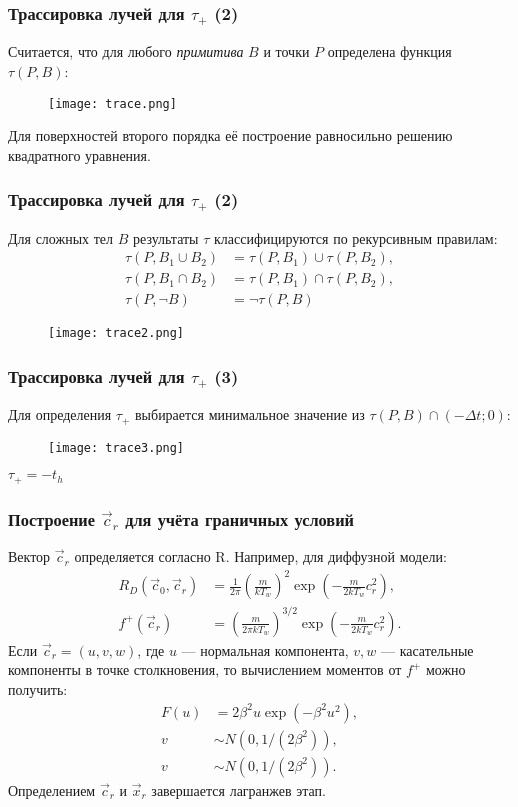 \documentclass[onlymath]{beamer}
\newcommand{\tr}\tau
\newcommand{\ts}{\Delta t}
\begin{document}
\begin{frame}
  \frametitle{Трассировка лучей для $\tau_+$ (2)}
  Считается, что для любого \emph{примитива} $B$ и точки $P$
  определена функция $\tau(P, B)$:
  \begin{figure}[!h]
    \centering
    \texttt{[image: trace.png]}
  \end{figure}
  Для поверхностей второго порядка её построение равносильно решению
  квадратного уравнения.
\end{frame}

\begin{frame}
  \frametitle{Трассировка лучей для $\tau_+$ (2)}
  Для сложных тел $B$ результаты $\tau$ классифицируются по
  рекурсивным правилам:
  \begin{equation}
    \label{eq:trace-compose}
    \begin{aligned}
      \tr(P, B_1 \cup B_2) &= \tr(P, B_1) \cup \tr(P, B_2),\\
      \tr(P, B_1 \cap B_2) &= \tr(P, B_1) \cap \tr(P, B_2),\\
      \tr(P, \neg{B}) &= \neg{\tr(P, B)}
    \end{aligned}
  \end{equation}
  \begin{figure}[!h]
    \centering
    \texttt{[image: trace2.png]}
  \end{figure}
\end{frame}

\begin{frame}
  \frametitle{Трассировка лучей для $\tau_+$ (3)}
  Для определения $\tau_+$ выбирается минимальное значение из $\tau(P,
  B) \cap (-\ts; 0)$:
  \begin{figure}[!h]
    \centering
    \texttt{[image: trace3.png]}
  \end{figure}  
  $\tau_+ = -t_h$
\end{frame}

\begin{frame}
  \frametitle{Построение $\vec{c}_r$ для учёта граничных условий}
  Вектор $\vec{c}_r$ определяется согласно R. Например, для диффузной модели:
  \begin{equation*}
    \begin{aligned}
      R_D(\vec{c}_0, \vec{c}_r) &=
      \frac{1}{2\pi}\left(\frac{m}{kT_w}\right)^2\exp\left(-\frac{m}{2kT_w}c^2_r\right),\\
      f^+(\vec{c}_r) &= \left(\frac{m}{2\pi k
          T_w}\right)^{3/2}\exp\left(-\frac{m}{2kT_w}c^2_r\right).
    \end{aligned}
  \end{equation*}
  Если $\vec{c}_r = (u, v, w)$, где $u$ — нормальная компонента, $v,
  w$ — касательные компоненты в точке столкновения, то вычислением
  моментов от $f^+$ можно получить:
  \begin{align*}
    F(u) &= 2\beta^2 u \exp(-\beta^2 u^2),\\
    v &\sim N(0, 1/(2\beta^2)),\\
    v &\sim N(0, 1/(2\beta^2)).
  \end{align*}
  Определением $\vec{c}_r$ и $\vec{x}_r$ завершается лагранжев этап.
\end{frame}
\end{document}
